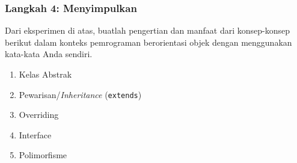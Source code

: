 \subsubsection{Langkah 4: Menyimpulkan}
Dari eksperimen di atas, buatlah pengertian dan manfaat dari konsep-konsep berikut dalam konteks pemrograman berorientasi objek dengan menggunakan kata-kata Anda sendiri.
\begin{enumerate}
	\item Kelas Abstrak
	\begin{tcolorbox}[colback=white, colframe=black,  width=\linewidth, height=3cm,  boxrule=1pt, sharp corners]
	\end{tcolorbox}
	\item Pewarisan/\textit{Inheritance} (\texttt{extends})
	\begin{tcolorbox}[colback=white, colframe=black,  width=\linewidth, height=3cm,  boxrule=1pt, sharp corners]
	\end{tcolorbox}
	\item Overriding
	\begin{tcolorbox}[colback=white, colframe=black,  width=\linewidth, height=3cm,  boxrule=1pt, sharp corners]
	\end{tcolorbox}
	\item Interface
	\begin{tcolorbox}[colback=white, colframe=black,  width=\linewidth, height=3cm,  boxrule=1pt, sharp corners]
	\end{tcolorbox}
	\item Polimorfisme
	\begin{tcolorbox}[colback=white, colframe=black,  width=\linewidth, height=3cm,  boxrule=1pt, sharp corners]
	\end{tcolorbox}
\end{enumerate}

